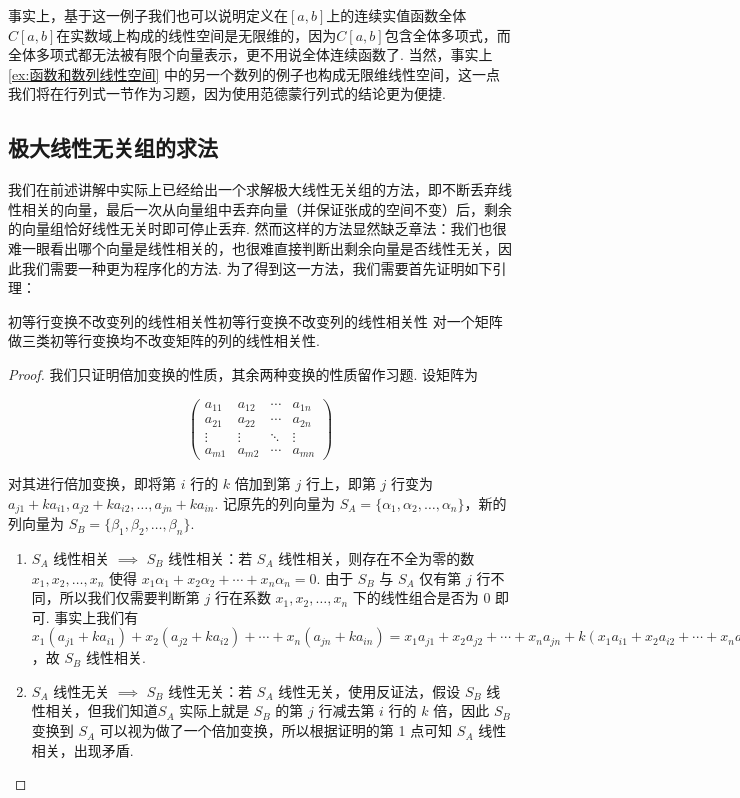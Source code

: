 事实上，基于这一例子我们也可以说明定义在$[a,b]$上的连续实值函数全体$C[a,b]$在实数域上构成的线性空间是无限维的，因为$C[a,b]$包含全体多项式，而全体多项式都无法被有限个向量表示，更不用说全体连续函数了. 当然，事实上\autoref{ex:函数和数列线性空间} 中的另一个数列的例子也构成无限维线性空间，这一点我们将在行列式一节作为习题，因为使用范德蒙行列式的结论更为便捷.

\subsection{极大线性无关组的求法}

我们在前述讲解中实际上已经给出一个求解极大线性无关组的方法，即不断丢弃线性相关的向量，最后一次从向量组中丢弃向量（并保证张成的空间不变）后，剩余的向量组恰好线性无关时即可停止丢弃. 然而这样的方法显然缺乏章法：我们也很难一眼看出哪个向量是线性相关的，也很难直接判断出剩余向量是否线性无关，因此我们需要一种更为程序化的方法. 为了得到这一方法，我们需要首先证明如下引理：

\begin{lemma}{初等行变换不改变列的线性相关性}{初等行变换不改变列的线性相关性}
    对一个矩阵做三类初等行变换均不改变矩阵的列的线性相关性.
\end{lemma}

\begin{proof}
    我们只证明倍加变换的性质，其余两种变换的性质留作习题. 设矩阵为

    \[\begin{pmatrix}
        a_{11} & a_{12} & \cdots & a_{1n} \\
        a_{21} & a_{22} & \cdots & a_{2n} \\
        \vdots & \vdots & \ddots & \vdots \\
        a_{m1} & a_{m2} & \cdots & a_{mn}
    \end{pmatrix}\]

    对其进行倍加变换，即将第 $i$ 行的 $k$ 倍加到第 $j$ 行上，即第 $j$ 行变为 $a_{j1} + ka_{i1}, a_{j2} + ka_{i2}, \ldots, a_{jn} + ka_{in}$. 记原先的列向量为 $S_A = \{\alpha_1, \alpha_2, \ldots, \alpha_n\}$，新的列向量为 $S_B = \{\beta_1, \beta_2, \ldots, \beta_n\}$.

    \begin{enumerate}
        \item $S_A$ 线性相关 $\implies$ $S_B$ 线性相关：若 $S_A$ 线性相关，则存在不全为零的数 $x_1, x_2, \ldots, x_n$ 使得 $x_1\alpha_1 + x_2\alpha_2 + \cdots + x_n\alpha_n = 0$. 由于 $S_B$ 与 $S_A$ 仅有第 $j$ 行不同，所以我们仅需要判断第 $j$ 行在系数 $x_1, x_2, \ldots, x_n$ 下的线性组合是否为 0 即可. 事实上我们有 $x_1(a_{j1} + ka_{i1}) + x_2(a_{j2} + ka_{i2}) + \cdots + x_n(a_{jn} + ka_{in}) = x_1a_{j1} + x_2a_{j2} + \cdots + x_na_{jn} + k(x_1a_{i1} + x_2a_{i2} + \cdots + x_na_{in}) = 0$，故 $S_B$ 线性相关.
        \item $S_A$ 线性无关 $\implies$ $S_B$ 线性无关：若 $S_A$ 线性无关，使用反证法，假设 $S_B$ 线性相关，但我们知道$S_A$ 实际上就是 $S_B$ 的第 $j$ 行减去第 $i$ 行的 $k$ 倍，因此 $S_B$ 变换到 $S_A$ 可以视为做了一个倍加变换，所以根据证明的第 1 点可知 $S_A$ 线性相关，出现矛盾.
    \end{enumerate}
\end{proof}

